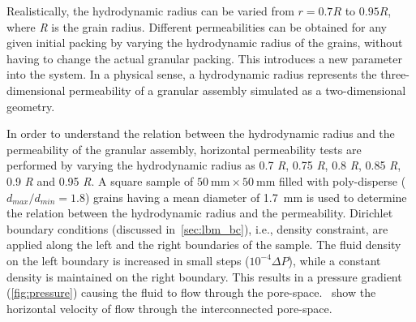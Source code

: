 Realistically, the hydrodynamic radius can be varied from $r = 0.7 R$ to 
$0.95 R$, where \textit{R} is the grain radius. Different permeabilities can be 
obtained for any given initial packing by varying the hydrodynamic radius of 
the grains, without having to change the actual granular packing. This 
introduces a new parameter into the system. In a physical sense, a 
hydrodynamic radius represents the three-dimensional permeability of a 
granular assembly simulated as a two-dimensional geometry.



In order to understand the relation between the hydrodynamic radius and the 
permeability of the granular assembly, horizontal permeability tests are 
performed by varying the hydrodynamic radius as 0.7 \textit{R}, 0.75 
\textit{R}, 0.8 \textit{R}, 0.85 \textit{R}, 
0.9 \textit{R} and 0.95 \textit{R}. A square sample of $50~\si{\mm} \times 
50~\si{\mm}$ filled 
with poly-disperse ($d_{max}/d_{min} = 1.8$) grains having a mean diameter of 
1.7~\si{\mm} is used to determine the relation between the hydrodynamic radius 
and the permeability. Dirichlet boundary conditions (discussed 
in~\cref{sec:lbm_bc}), i.e., density constraint, are applied along the left and 
the right boundaries of the sample. The fluid density on the left boundary is 
increased in small steps ($10^{-4} \Delta P$), while a constant density is 
maintained on the right boundary. This results in a pressure gradient  
(\cref{fig:pressure}) causing the fluid to flow through the 
pore-space.~ show the horizontal velocity of flow through 
the interconnected pore-space.

